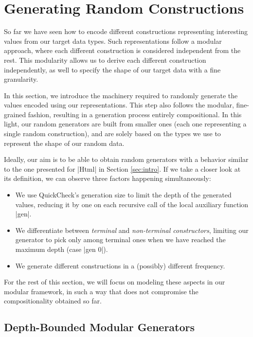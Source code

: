 \section{Generating Random Constructions}
\label{sec:generators}

%
So far we have seen how to encode different constructions representing
interesting values from our target data types.
%
Such representations follow a modular approach, where each different
construction is considered independent from the rest.
%
This modularity allows us to derive each different construction independently,
as well to specify the shape of our target data with a fine granularity.


In this section, we introduce the machinery required to randomly generate the
values encoded using our representations.
%
This step also follows the modular, fine-grained fashion, resulting in a
generation process entirely compositional.
%
In this light, our random generators are built from smaller ones (each one
representing a single random construction), and are solely based on the types we
use to represent the shape of our random data.


Ideally, our aim is to be able to obtain random generators with a behavior
similar to the one presented for |Html| in Section \ref{sec:intro}.
%
If we take a closer look at its definition, we can observe three factors
happening simultaneously:
%
\begin{itemize}
\item We use QuickCheck's generation size to limit the depth of the generated
  values, reducing it by one on each recursive call of the local auxiliary
  function |gen|.
\item We differentiate between \emph{terminal} and \emph{non-terminal
    constructors}, limiting our generator to pick only among terminal ones when
  we have reached the maximum depth (case |gen 0|).
\item We generate different constructions in a (possibly) different frequency.
\end{itemize}
%
For the rest of this section, we will focus on modeling these aspects in our
modular framework, in such a way that does not compromise the compositionality
obtained so far.


%
\subsection{Depth-Bounded Modular Generators}

